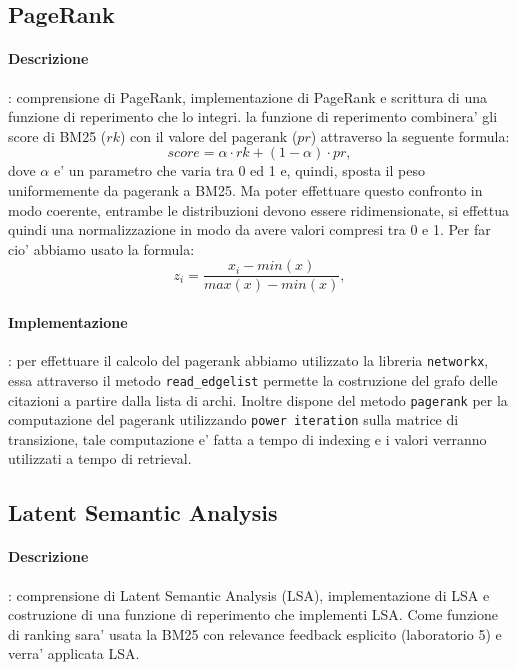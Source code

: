 \subsection{PageRank}
\label{sec:pagerank}

\paragraph{\textbf{Descrizione}}: comprensione di PageRank, implementazione di PageRank e scrittura di una funzione di reperimento che lo integri.
la funzione di reperimento combinera' gli score di BM25 ($rk$) con il valore del pagerank ($pr$) attraverso la seguente formula:
\[ score =  \alpha \cdot rk + (1-\alpha) \cdot pr,\]
dove $\alpha$ e' un parametro che varia tra 0 ed 1 e, quindi, sposta il peso uniformemente da pagerank a BM25.
Ma poter effettuare questo confronto in modo coerente, entrambe le distribuzioni devono essere ridimensionate, si effettua quindi una normalizzazione in modo da avere valori compresi tra 0 e 1. Per far cio' abbiamo usato la formula:
\[ z_i = \frac{x_i - min(x)}{max(x) - min(x)}, \]


\paragraph{\textbf{Implementazione}}: per effettuare il calcolo del pagerank abbiamo utilizzato la libreria \texttt{networkx}, essa attraverso il metodo \texttt{read\_edgelist} permette la costruzione del grafo delle citazioni a partire dalla lista di archi. Inoltre dispone del metodo \texttt{pagerank} per la computazione del pagerank utilizzando \texttt{power iteration} sulla matrice di transizione, tale computazione e' fatta a tempo di indexing e i valori verranno utilizzati a tempo di retrieval.

\subsection{Latent Semantic Analysis}
\label{sec:lsa}

\paragraph{\textbf{Descrizione}}: comprensione di Latent Semantic Analysis (LSA), implementazione di LSA e costruzione di una funzione di reperimento che implementi LSA.
Come funzione di ranking sara' usata la BM25 con relevance feedback esplicito (laboratorio 5) e verra' applicata LSA. 


